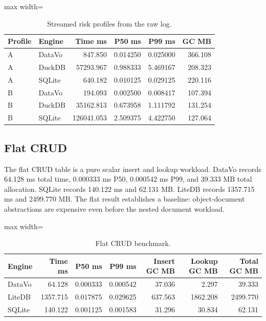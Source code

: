 \documentclass[11pt]{article}
\begin{document}
\begin{table}[H]
\caption{Streamed risk profiles from the raw log.}
\label{tab:risk}
\centering
\small
\begin{adjustbox}{max width=\textwidth}
\begin{tabular}{llrrrr}
\toprule
Profile & Engine & Time ms & P50 ms & P99 ms & GC MB \\
\midrule
A & DataVo & 847.850 & 0.014250 & 0.025000 & 366.108 \\
A & DuckDB & 57293.967 & 0.988333 & 5.469167 & 208.323 \\
A & SQLite & 640.182 & 0.010125 & 0.029125 & 220.116 \\
B & DataVo & 194.093 & 0.002500 & 0.008417 & 107.394 \\
B & DuckDB & 35162.813 & 0.673958 & 1.111792 & 131.254 \\
B & SQLite & 126041.053 & 2.509375 & 4.422750 & 127.064 \\
\bottomrule
\end{tabular}
\end{adjustbox}
\end{table}

\FloatBarrier

\subsection{Flat CRUD}
The flat CRUD table is a pure scalar insert and lookup workload. DataVo records \num{64.128} ms total time, \num{0.000333} ms P50, \num{0.000542} ms P99, and \num{39.333} MB total allocation. SQLite records \num{140.122} ms and \num{62.131} MB. LiteDB records \num{1357.715} ms and \num{2499.770} MB. The flat result establishes a baseline: object-document abstractions are expensive even before the nested document workload.

\begin{table}[H]
\caption{Flat CRUD benchmark.}
\label{tab:flat}
\centering
\small
\begin{adjustbox}{max width=\textwidth}
\begin{tabular}{lrrrrrr}
\toprule
Engine & Time ms & P50 ms & P99 ms & Insert GC MB & Lookup GC MB & Total GC MB \\
\midrule
DataVo & 64.128 & 0.000333 & 0.000542 & 37.036 & 2.297 & 39.333 \\
LiteDB & 1357.715 & 0.017875 & 0.029625 & 637.563 & 1862.208 & 2499.770 \\
SQLite & 140.122 & 0.001125 & 0.001583 & 31.296 & 30.834 & 62.131 \\
\bottomrule
\end{tabular}
\end{adjustbox}
\end{table}
\end{document}
